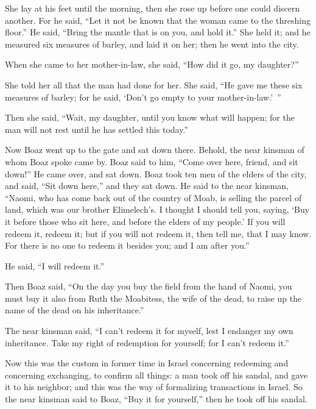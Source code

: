 \myverse{}She lay at his feet until the morning, then she rose up before
one could discern another. For he said, “Let it not be known that the woman came to the threshing floor.”
\myverse{}He said, “Bring the mantle that is on you, and hold it.” She held it; and
he measured six measures of barley, and laid it on her; then he went into the city.

\myverse{}When she came to her mother-in-law, she said, “How did it go,
my daughter?”

She told her all that the man had done for her.
\myverse{}She said, “He gave me these six measures of barley; for he said, ‘Don’t go
empty to your mother-in-law.’ ”

\myverse{}Then she said, “Wait, my daughter, until you know what will happen;
for the man will not rest until he has settled this today.”


\mychapter{} \myverse*{}Now Boaz went up to the gate and sat down there. Behold, the near
kinsman of whom Boaz spoke came by. Boaz said to him, “Come over here, friend, and sit down!” He came
over, and sat down.
\myverse{}Boaz took ten men of the elders of the city, and said, “Sit down here,” and
they sat down.
\myverse{}He said to the near kinsman, “Naomi, who has come back out of the country of
Moab, is selling the parcel of land, which was our brother Elimelech’s.
\myverse{}I thought I should tell you, saying, ‘Buy it before those who sit here, and
before the elders of my people.’ If you will redeem it, redeem it; but if you will not redeem it, then
tell me, that I may know. For there is no one to redeem it besides you; and I am after you.”

He said, “I will redeem it.”

\myverse{}Then Boaz said, “On the day you buy the field from the hand of
Naomi, you must buy it also from Ruth the Moabitess, the wife of the dead, to raise up the name of the
dead on his inheritance.”

\myverse{}The near kinsman said, “I can’t redeem it for myself, lest I endanger
my own inheritance. Take my right of redemption for yourself; for I can’t redeem it.”

\myverse{}Now this was the custom in former time in Israel concerning redeeming
and concerning exchanging, to confirm all things: a man took off his sandal, and gave it to his neighbor;
and this was the way of formalizing transactions in Israel.
\myverse{}So the near kinsman said to Boaz, “Buy it for yourself,” then he took off his
sandal.

